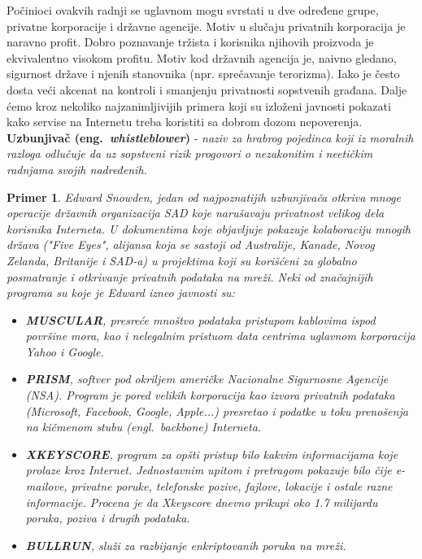 \documentclass[a4paper]{article}
\newtheorem{primer}{Primer}[section]
\begin{document}
	Počinioci ovakvih radnji se uglavnom mogu svrstati u dve određene grupe, privatne korporacije i državne agencije. Motiv u slučaju privatnih korporacija je naravno profit. Dobro poznavanje tržista i korisnika njihovih proizvoda je ekvivalentno visokom profitu. Motiv kod državnih agencija je, naivno gledano, sigurnost države i njenih stanovnika (npr. sprečavanje terorizma). Iako je često dosta veći akcenat na kontroli i smanjenju privatnosti sopstvenih građana. Dalje ćemo kroz nekoliko najzanimljivijih primera koji su izloženi javnosti pokazati kako servise na Internetu treba koristiti sa dobrom dozom nepoverenja.\\
	
\textbf{Uzbunjivač (eng.~{\em whistleblower})} - \textit{naziv za hrabrog pojedinca koji iz moralnih razloga odlučuje da uz sopstveni rizik progovori o nezakonitim i neetičkim radnjama svojih nadređenih.}

\begin{primer}
	Edward Snowden, jedan od najpoznatijih uzbunjivača otkriva mnoge operacije državnih organizacija SAD koje narušavaju privatnost velikog dela korisnika Interneta. U dokumentima koje objavljuje pokazuje kolaboraciju mnogih država ("Five Eyes", alijansa koja se sastoji od Australije, Kanade, Novog Zelanda, Britanije i SAD-a) u projektima koji su korišćeni za globalno posmatranje i otkrivanje privatnih podataka na mreži.\cite{noPlaceToHide} Neki od značajnijih programa su koje je Edward izneo javnosti su:
\begin{itemize}
	\item \textbf{MUSCULAR}, presreće mnoštvo podataka pristupom kablovima ispod površine mora, kao i nelegalnim pristuom data centrima uglavnom korporacija Yahoo i Google. \cite{noPlaceToHide}
	\item \textbf{PRISM}, softver pod okriljem američke Nacionalne Sigurnosne Agencije (NSA). Program je pored velikih korporacija kao izvora privatnih podataka (Microsoft, Facebook, Google, Apple...) presretao i podatke u toku prenošenja na kičmenom stubu (engl.~{\em backbone}) Interneta. \cite{noPlaceToHide}
	\item \textbf{XKEYSCORE}, program za opšti pristup bilo kakvim informacijama koje prolaze kroz Internet. Jednostavnim upitom i pretragom pokazuje bilo čije e-mailove, privatne poruke, telefonske pozive, fajlove, lokacije i ostale razne informacije. Procena je da Xkeyscore dnevno prikupi oko 1.7 milijardu poruka, poziva i drugih podataka. \cite{noPlaceToHide}
	\item \textbf{BULLRUN}, služi za razbijanje enkriptovanih poruka na mreži. \cite{noPlaceToHide}
\end{itemize}
\end{primer}
\end{document}
